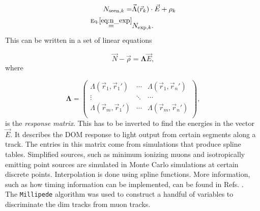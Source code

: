 \begin{equation}
\begin{split}
N_{\textrm{seen},k} = &\vec{\Lambda}(\vec{r}_k) \cdot \vec{E} + \rho_k\\
\overset{\textrm{Eq.}\ref{eq:n_exp}}{=} &N_{\textrm{exp},k}
.
\end{split}
\end{equation}
\noindent This can be written in a set of linear equations

\begin{equation}
\vec{N} - \vec{\rho} = \mathbf{\Lambda} \vec{E}, 
\end{equation}
\noindent where

\begin{equation}
\mathbf{\Lambda} = 
\begin{pmatrix}
\Lambda(\vec{r}_1,\vec{r}_1') & \cdots & \Lambda(\vec{r}_1,\vec{r}_n')\\
\vdots  & \ddots & \cdots \\
\Lambda(\vec{r}_m,\vec{r}_1') & \cdots & \Lambda(\vec{r}_m,\vec{r}_n')\\
\end{pmatrix},
\end{equation}
\noindent is the \textit{response matrix}. This has to be inverted to find the energies in the vector $\vec{E}$. It describes the DOM response to light output from certain segments along a track. The entries in this matrix come from simulations that produce spline tables. Simplified sources, such as minimum ionizing muons and isotropically emitting point sources are simulated in Monte Carlo simulations at certain discrete points. Interpolation is done using spline functions. More information, such as how timing information can be implemented, can be found in Refs. \cite{millipedeinternal,stefthesis}.\\

\noindent The \texttt{Millipede} algorithm was used to construct a handful of variables to discriminate the dim tracks from muon tracks.


